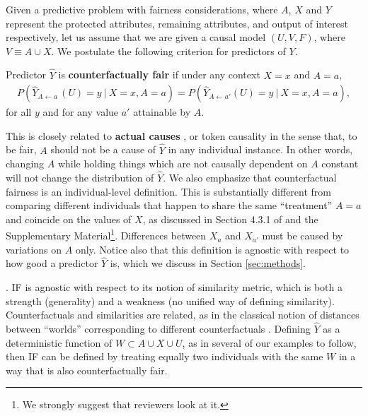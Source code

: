 Given a predictive problem with fairness considerations, where $A$, $X$ and $Y$
represent the protected attributes, remaining attributes, and output of interest respectively,
let us assume that we are given a causal model $(U, V, F)$, where $V \equiv A \cup X$.
We postulate the following criterion for predictors of $Y$.
\begin{define}
Predictor $\hat Y$ is {\bf counterfactually fair}
if under any context $X = x$ and $A = a$,
  \label{eq:cf_definition}
\begin{align}
  P(\hat Y_{A \leftarrow a\ }(U) = y\ |\ X = x, A = a)  =%
  P(\hat Y_{A \leftarrow a'}(U) = y\ |\ X = x, A = a), 
\end{align}
for all $y$ and for any value $a'$ attainable by $A$.
\end{define}

This is closely related to
{\bf actual causes} \cite{halpern:16}, or token causality in the sense
that, to be fair, $A$ should not be a cause of $\hat Y$ in any
individual instance. In other words, changing $A$ while holding things
which are not causally dependent on $A$ constant
will not change the distribution of $\hat Y$.
We also emphasize that
counterfactual fairness is an individual-level definition. This is
substantially different from comparing different individuals that happen to
share the same ``treatment'' $A = a$ and coincide on the values of
$X$, as discussed in Section 4.3.1 of \citep{pearl:16} and the
Supplementary Material\footnote{We strongly suggest that reviewers
  look at it.}. Differences between $X_a$ and $X_{a'}$ must be caused
by variations on $A$ only. Notice also that this definition is
agnostic with respect to how good a predictor $\hat Y$ is, which we
discuss in Section \ref{sec:methods}.

. IF is agnostic with
respect to its notion of similarity metric, which is both a strength
(generality) and a weakness (no unified way of defining similarity).
Counterfactuals and similarities are related, as in the classical
notion of distances between ``worlds'' corresponding to different
counterfactuals \cite{lewis:73}. Defining $\hat Y$ as a
deterministic function of $W \subset A \cup X \cup U$, as in several
of our examples to follow, then IF can be defined by treating equally two
individuals with the same $W$ in a way that is also counterfactually fair.

